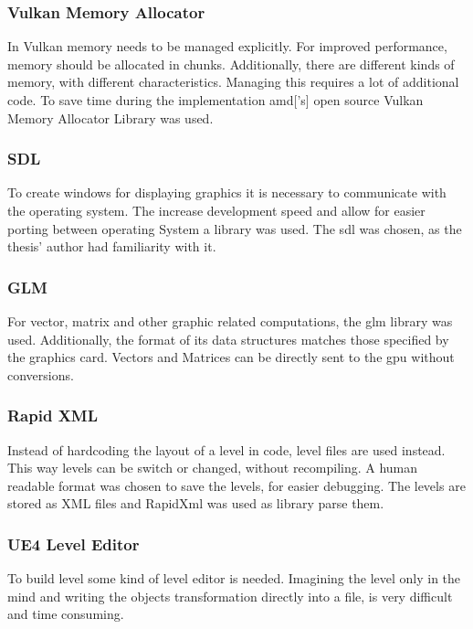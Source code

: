 \subsubsection{Vulkan Memory Allocator}
In Vulkan memory needs to be managed explicitly. For improved performance, memory should be allocated in chunks. Additionally, there are different kinds of memory, with different characteristics. Managing this requires a lot of additional code. To save time during the implementation \gls{amd}['s] open source Vulkan Memory Allocator Library \cite{amd:vulkanmemoryallocator} was used.


\subsubsection{SDL}
To create windows for displaying graphics it is necessary to communicate with the operating system. The increase development speed and allow for easier porting between operating System a library was used. The \gls{sdl} \cite{sdl} was chosen, as the thesis' author had familiarity with it.

\subsubsection{GLM}
For vector, matrix and other graphic related computations, the \gls{glm} library \cite{glm} was used. Additionally, the format of its data structures matches those specified by the graphics card. Vectors and Matrices can be directly sent to the \gls{gpu} without conversions.


\subsubsection{Rapid XML}
Instead of hardcoding the layout of a level in code, level files are used instead. This way levels can be switch or changed, without recompiling. A human readable format was chosen to save the levels, for easier debugging. The levels are stored as XML files and RapidXml \cite{rapidxml} was used as library parse them.

\subsubsection{UE4 Level Editor}
To build level some kind of level editor is needed. Imagining the level only in the mind and writing the objects transformation directly into a file, is very difficult and time consuming.

